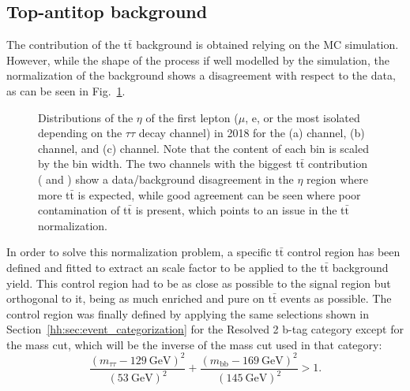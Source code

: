 \documentclass[../main.tex]{subfiles}
\begin{document}
\subsection{Top-antitop background}
\label{hh:subsec:tt}

The contribution of the t$\bar{\text{t}}$ background is obtained relying on the MC simulation. However, while the shape of the process if well modelled by the simulation, the normalization of the background shows a disagreement with respect to the data, as can be seen in Fig.~\ref{hh:fig:ttbar_disc}.

\begin{figure}[h]
\begin{center}
\end{center}
\caption[Pseudorapidity of the first lepton in 2018]{Distributions of the $\eta$ of the first lepton ($\mu$, e, or the most isolated \tauh{} depending on the $\tau\tau$ decay channel) in 2018 for the (a) \taumu\tauh{} channel, (b) \taue\tauh{} channel, and (c) \tauh\tauh{} channel. Note that the content of each bin is scaled by the bin width. The two channels with the biggest t$\bar{\text{t}}$ contribution (\taumu\tauh{} and \taue\tauh{}) show a data/background disagreement in the $\eta$ region where more t$\bar{\text{t}}$ is expected, while good agreement can be seen where poor contamination of t$\bar{\text{t}}$ is present, which points to an issue in the t$\bar{\text{t}}$ normalization.}
\label{hh:fig:ttbar_disc}
\end{figure}

In order to solve this normalization problem, a specific t$\bar{\text{t}}$ control region has been defined and fitted to extract an scale factor to be applied to the t$\bar{\text{t}}$ background yield. This control region had to be as close as possible to the signal region but orthogonal to it, being as much enriched and pure on t$\bar{\text{t}}$ events as possible. The control region was finally defined by applying the same selections shown in Section~\ref{hh:sec:event_categorization} for the Resolved 2 b-tag category except for the mass cut, which will be the inverse of the mass cut used in that category:
\begin{equation}
\frac{(m_{\tau\tau} - 129~\text{GeV})^2}{(53~\text{GeV})^2} + \frac{(m_\text{bb} - 169~\text{GeV})^2}{(145~\text{GeV})^2} > 1.
\end{equation}
\end{document}
